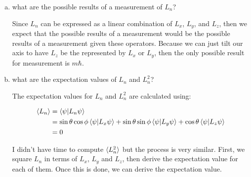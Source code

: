 \documentclass[10pt]{article}
\begin{document}
    \begin{enumerate}[(a)]
        \item what are the possible results of a measurement of $L_n$?
        
        \begin{solution}
            Since $L_n$ can be expressed as a linear combination of $L_x$, $L_y$, and $L_z$, then we expect that the possible results of a measurement would be the possible results of a measurement given these operators. Because we can just tilt our axis to have $L_z$ be the represented by $L_x$ or $L_y$, then the only possible result for measurement is $m\hbar$.

        \end{solution}
        \item what are the expectation values of $L_n$ and $L_n^2$?

        \begin{solution}
            The expectation values for $L_n$ and $L_n^2$ are calculated using: 

            \begin{align*}
                \langle L_n \rangle &= \braket{\psi}{L_n \psi}\\
                &= \sin \theta \cos \phi \braket{\psi}{L_x \psi} +\sin \theta \sin \phi \braket{\psi}{L_y\psi} + \cos \theta \braket{\psi}{L_z\psi}\\
                &= 0
            \end{align*}

            I didn't have time to compute $\langle L_n^2 \rangle$ but the process is very similar. First, we square $L_n$ in terms of $L_x$, $L_y$ and $L_z$, then derive the expectation value for each of them. Once this is done, we can derive the expectation value.
        \end{solution}
    \end{enumerate}
\end{document}
